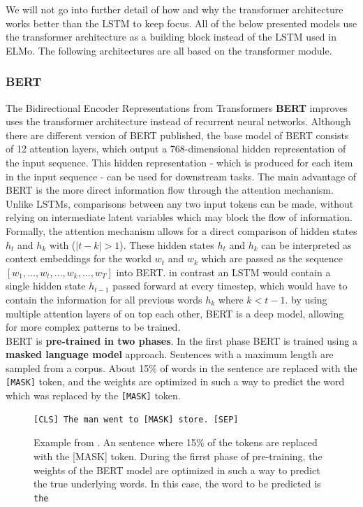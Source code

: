 \documentclass[a4paper,12pt,twoside,openright]{report}
\begin{document}
We will not go into further detail of how and why the transformer architecture works better than the LSTM to keep focus.
All of the below presented models use the transformer architecture as a building block instead of the LSTM used in ELMo.
The following architectures are all based on the transformer module.

\subsubsection{BERT}\label{section:BERT}
 
The Bidirectional Encoder Representations from Transformers \textbf{BERT} \cite{devlin18} improves uses the transformer architecture instead of recurrent neural networks.
Although there are different version of BERT published, the base model of BERT consists of 12 attention layers, which output a 768-dimensional hidden representation of the input sequence.
This hidden representation - which is produced for each item in the input sequence - can be used for downstream tasks.
The main advantage of BERT is the more direct information flow through the attention mechanism. 
Unlike LSTMs, comparisons between any two input tokens can be made, without relying on intermediate latent variables which may block the flow of information.
Formally, the attention mechanism allows for a direct comparison of hidden states $h_t$ and $h_k$ with ($|t - k| > 1$).
These hidden states $h_t$ and $h_k$ can be interpreted as context  embeddings for the workd $w_t$ and $w_k$ which are passed as the sequence $[w_1, \ldots, w_t, \ldots, w_k, \ldots, w_T]$ into BERT.
in contrast  an LSTM would contain a single hidden state $h_{t-1}$ passed forward at every timestep, which would have to contain the information for all previous words $h_k$ where $k < t - 1$.
by using multiple attention layers of on top each other, BERT is a deep model, allowing for more complex patterns to be trained. \\

BERT is \textbf{pre-trained in two phases}. 
In the first phase BERT is trained using a \textbf{masked language model} approach. 
Sentences with a maximum length are sampled from a corpus.
About 15\% of words in the sentence are replaced with the \texttt{[MASK]} token, and the weights are optimized in such a way to predict the word which was replaced by the \Verb#[MASK]# token. \\

\begin{figure}[h]
\begin{verbatim}
[CLS] The man went to [MASK] store. [SEP]
\end{verbatim}
\caption{Example from \cite{devlin18}. 
An sentence where 15\% of the tokens are replaced with the [MASK] token. 
During the firrst phase of pre-training, the weights of the BERT model are optimized in such a way to predict the true underlying words.
In this case, the word to be predicted is \texttt{the}
}
\end{figure}
\end{document}
